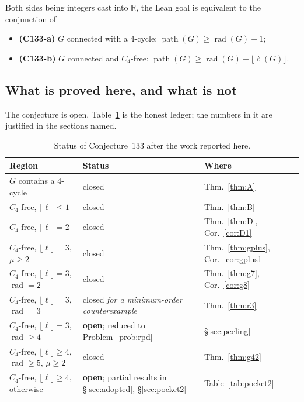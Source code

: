 \documentclass[11pt]{article}
\theoremstyle{plain}
\theoremstyle{definition}
\theoremstyle{remark}
\numberwithin{equation}{section}
\newcommand{\R}{\mathbb{R}}
\newcommand{\rad}{\operatorname{rad}}
\newcommand{\pth}{\operatorname{path}}
\begin{document}
Both sides being integers cast into $\R$, the Lean goal is equivalent to the conjunction of

\begin{itemize}
\item \textbf{(C133-a)} \; $G$ connected with a $4$-cycle: \; $\pth(G) \ge \rad(G) + 1$;
\item \textbf{(C133-b)} \; $G$ connected and $C_4$-free: \;
      $\pth(G) \ge \rad(G) + \lfloor \ell(G)\rfloor$.
\end{itemize}

\subsection{What is proved here, and what is not}

The conjecture is open. Table~\ref{tab:status} is the honest ledger; the numbers in it are
justified in the sections named.

\begin{table}[ht]
\centering
\small
\begin{tabular}{@{}lll@{}}
\toprule
Region & Status & Where \\
\midrule
$G$ contains a $4$-cycle & closed & Thm.~\ref{thm:A} \\
$C_4$-free, $\lfloor\ell\rfloor \le 1$ & closed & Thm.~\ref{thm:B} \\
$C_4$-free, $\lfloor\ell\rfloor = 2$ & closed & Thm.~\ref{thm:D}, Cor.~\ref{cor:D1} \\
$C_4$-free, $\lfloor\ell\rfloor = 3$, $\mu \ge 2$ & closed & Thm.~\ref{thm:gplus},
   Cor.~\ref{cor:gplus1} \\
$C_4$-free, $\lfloor\ell\rfloor = 3$, $\rad = 2$ & closed & Thm.~\ref{thm:g7},
   Cor.~\ref{cor:g8} \\
$C_4$-free, $\lfloor\ell\rfloor = 3$, $\rad = 3$ & closed \emph{for a minimum-order
   counterexample} & Thm.~\ref{thm:r3} \\
$C_4$-free, $\lfloor\ell\rfloor = 3$, $\rad \ge 4$ & \textbf{open}; reduced to
   Problem~\ref{prob:rpd} & \S\ref{sec:peeling} \\
$C_4$-free, $\lfloor\ell\rfloor \ge 4$, $\rad \ge 5$, $\mu \ge 2$ & closed &
   Thm.~\ref{thm:g42} \\
$C_4$-free, $\lfloor\ell\rfloor \ge 4$, otherwise & \textbf{open}; partial results in
   \S\ref{sec:adopted}, \S\ref{sec:pocket2} & Table~\ref{tab:pocket2} \\
\bottomrule
\end{tabular}
\caption{Status of Conjecture~133 after the work reported here.}
\label{tab:status}
\end{table}
\end{document}
